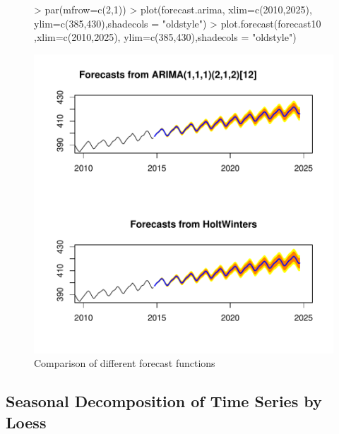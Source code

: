 \documentclass[10pt, a4paper]{article} %
\begin{document}
\begin{figure}
\centering
\begin{Schunk}
\begin{Sinput}
> par(mfrow=c(2,1))
> plot(forecast.arima, xlim=c(2010,2025), ylim=c(385,430),shadecols = "oldstyle")
> plot.forecast(forecast10 ,xlim=c(2010,2025), ylim=c(385,430),shadecols = "oldstyle")
\end{Sinput}
\end{Schunk}
\includegraphics{FINAL_VERSION-075}
\caption{Comparison of different forecast functions}
\end{figure}

\subsection{Seasonal Decomposition of Time Series by Loess}
\end{document}
